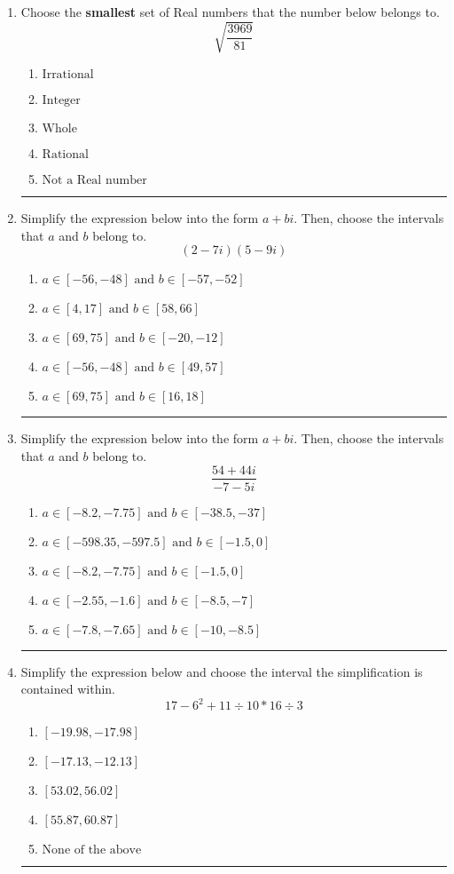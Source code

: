 \documentclass[14pt]{extbook}
\newcommand{\litem}[1]{\item#1\hspace*{-1cm}\rule{\textwidth}{0.4pt}}
\begin{document}
\begin{enumerate}
\litem{
Choose the \textbf{smallest} set of Real numbers that the number below belongs to.\[ \sqrt{\frac{3969}{81}} \]\begin{enumerate}[label=\Alph*.]
\item \( \text{Irrational} \)
\item \( \text{Integer} \)
\item \( \text{Whole} \)
\item \( \text{Rational} \)
\item \( \text{Not a Real number} \)

\end{enumerate} }
\litem{
Simplify the expression below into the form $a+bi$. Then, choose the intervals that $a$ and $b$ belong to.\[ (2 - 7 i)(5 - 9 i) \]\begin{enumerate}[label=\Alph*.]
\item \( a \in [-56, -48] \text{ and } b \in [-57, -52] \)
\item \( a \in [4, 17] \text{ and } b \in [58, 66] \)
\item \( a \in [69, 75] \text{ and } b \in [-20, -12] \)
\item \( a \in [-56, -48] \text{ and } b \in [49, 57] \)
\item \( a \in [69, 75] \text{ and } b \in [16, 18] \)

\end{enumerate} }
\litem{
Simplify the expression below into the form $a+bi$. Then, choose the intervals that $a$ and $b$ belong to.\[ \frac{54 + 44 i}{-7 - 5 i} \]\begin{enumerate}[label=\Alph*.]
\item \( a \in [-8.2, -7.75] \text{ and } b \in [-38.5, -37] \)
\item \( a \in [-598.35, -597.5] \text{ and } b \in [-1.5, 0] \)
\item \( a \in [-8.2, -7.75] \text{ and } b \in [-1.5, 0] \)
\item \( a \in [-2.55, -1.6] \text{ and } b \in [-8.5, -7] \)
\item \( a \in [-7.8, -7.65] \text{ and } b \in [-10, -8.5] \)

\end{enumerate} }
\litem{
Simplify the expression below and choose the interval the simplification is contained within.\[ 17 - 6^2 + 11 \div 10 * 16 \div 3 \]\begin{enumerate}[label=\Alph*.]
\item \( [-19.98, -17.98] \)
\item \( [-17.13, -12.13] \)
\item \( [53.02, 56.02] \)
\item \( [55.87, 60.87] \)
\item \( \text{None of the above} \)


\end{enumerate}}
\end{enumerate}
\end{document}
